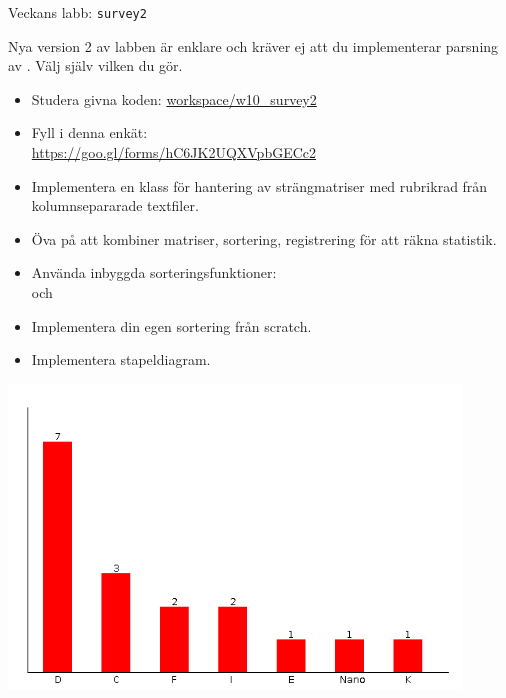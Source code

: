 

\ifkompendium\else

\begin{Slide}{Veckans labb: \texttt{survey2}}\SlideFontTiny
\begin{minipage}{0.65\textwidth}
Nya version 2 av labben är enklare och kräver ej att du implementerar parsning av . Välj själv vilken du gör.

\vspace{0.5em}
\begin{itemize}
\item Studera givna koden: {\SlideFontTiny \href{https://github.com/lunduniversity/introprog/tree/master/workspace/w10_survey2/src/main/scala/stats}{workspace/w10\_survey2}}
\item Fyll i denna enkät:
\\{\SlideFontTiny \url{https://goo.gl/forms/hC6JK2UQXVpbGECc2}} 
\end{itemize}

\begin{itemize}
\item Implementera en klass  för hantering av strängmatriser med rubrikrad från kolumnsepararade textfiler.
\item Öva på att kombiner matriser, sortering, registrering för att räkna statistik.
\item Använda inbyggda sorteringsfunktioner: \\ och 
\item Implementera din egen sortering från scratch.
\end{itemize}
\begin{itemize}
\item Implementera stapeldiagram.
\end{itemize}
\end{minipage}
\hfill\begin{minipage}{0.27\textwidth}
\centering
\includegraphics[width=0.9\textwidth]{../img/survey/bar}


\end{minipage}
\end{Slide}
